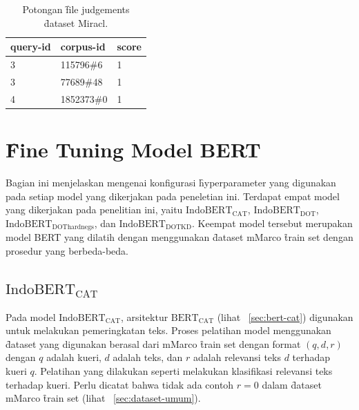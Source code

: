 \begin{table}
    \centering
    \caption{Potongan \f{file} judgements \f{dataset} Miracl.}
    \label{tab:judgements-file-example-bab4}
    \begin{tabular}{|l|l|l|}
        \hline
        \textbf{query-id} & \textbf{corpus-id} & \textbf{score} \\ \hline
        3                 & 115796\#6          & 1              \\ \hline
        3                 & 77689\#48          & 1              \\ \hline
        4                 & 1852373\#0         & 1              \\ \hline
    \end{tabular}
\end{table}


\section{\f{Fine Tuning} Model BERT}
\label{sec:finetuning}

Bagian ini menjelaskan mengenai konfigurasi \f{hyperparameter} yang digunakan pada setiap model yang dikerjakan pada peneletian ini. Terdapat empat model yang dikerjakan pada penelitian ini, yaitu $\text{IndoBERT}_{\text{CAT}}$, $\text{IndoBERT}_{\text{DOT}}$, $\text{IndoBERT}_{\text{DOThardnegs}}$, dan $\text{IndoBERT}_{\text{DOTKD}}$. Keempat model tersebut merupakan model BERT yang dilatih dengan menggunakan \f{dataset} mMarco \f{train set} dengan prosedur yang berbeda-beda.

\subsection{$\text{IndoBERT}_{\text{CAT}}$}

Pada model $\text{IndoBERT}_{\text{CAT}}$, arsitektur $\text{BERT}_\text{CAT}$ (lihat \sect~\ref{sec:bert-cat}) digunakan untuk melakukan pemeringkatan teks. Proses pelatihan model menggunakan \f{dataset} yang digunakan berasal dari mMarco \f{train set} dengan format $(q, d, r)$ dengan $q$ adalah kueri, $d$ adalah teks, dan $r$ adalah relevansi teks $d$ terhadap kueri $q$. Pelatihan yang dilakukan seperti melakukan klasifikasi relevansi teks terhadap kueri. Perlu dicatat bahwa tidak ada contoh $r=0$ dalam \f{dataset} mMarco \f{train set} (lihat \sect~\ref{sec:dataset-umum}).

